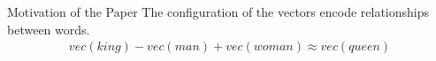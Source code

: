 \begin{frame}{Motivation of the Paper}
  The configuration of the vectors encode relationships between words.
  \begin{align*}
    vec(king) - vec(man) + vec(woman) \approx vec(queen)
  \end{align*}
\end{frame}

